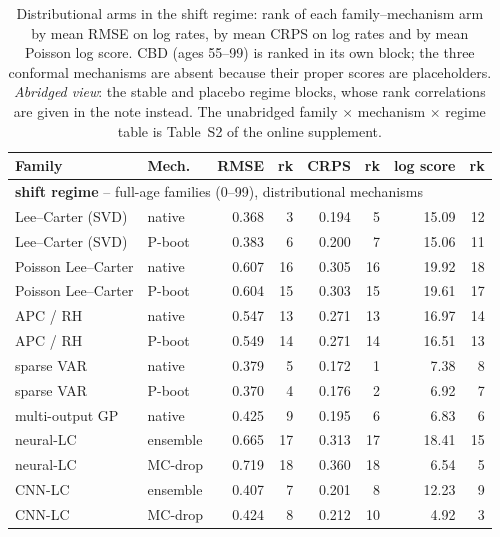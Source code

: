 \begin{table}[tbp]
\centering
\caption{Distributional arms in the shift regime: rank of each family--mechanism arm by mean RMSE on log rates, by mean CRPS on log rates and by mean Poisson log score. CBD (ages 55--99) is ranked in its own block; the three conformal mechanisms are absent because their proper scores are placeholders. \emph{Abridged view}: the stable and placebo regime blocks, whose rank correlations are given in the note instead. The unabridged family $\times$ mechanism $\times$ regime table is Table~S2 of the online supplement.}\label{tab:h1-rankings-main}
\begin{threeparttable}\scriptsize\renewcommand{\arraystretch}{0.90}\setlength{\tabcolsep}{2.5pt}
\begin{tabular}{@{}llrrrrrr@{}}
\toprule
Family & Mech. & RMSE & rk & CRPS & rk & log score & rk \\
\midrule
\multicolumn{8}{l}{\textbf{shift regime} -- full-age families (0--99), distributional mechanisms} \\
\midrule
Lee--Carter (SVD) & native & 0.368 & 3 & 0.194 & 5 & 15.09 & 12 \\
Lee--Carter (SVD) & P-boot & 0.383 & 6 & 0.200 & 7 & 15.06 & 11 \\
Poisson Lee--Carter & native & 0.607 & 16 & 0.305 & 16 & 19.92 & 18 \\
Poisson Lee--Carter & P-boot & 0.604 & 15 & 0.303 & 15 & 19.61 & 17 \\
APC / RH & native & 0.547 & 13 & 0.271 & 13 & 16.97 & 14 \\
APC / RH & P-boot & 0.549 & 14 & 0.271 & 14 & 16.51 & 13 \\
sparse VAR & native & 0.379 & 5 & 0.172 & 1 & 7.38 & 8 \\
sparse VAR & P-boot & 0.370 & 4 & 0.176 & 2 & 6.92 & 7 \\
multi-output GP & native & 0.425 & 9 & 0.195 & 6 & 6.83 & 6 \\
neural-LC & ensemble & 0.665 & 17 & 0.313 & 17 & 18.41 & 15 \\
neural-LC & MC-drop & 0.719 & 18 & 0.360 & 18 & 6.54 & 5 \\
CNN-LC & ensemble & 0.407 & 7 & 0.201 & 8 & 12.23 & 9 \\
CNN-LC & MC-drop & 0.424 & 8 & 0.212 & 10 & 4.92 & 3 \\

\end{tabular}
\end{threeparttable}
\end{table}
